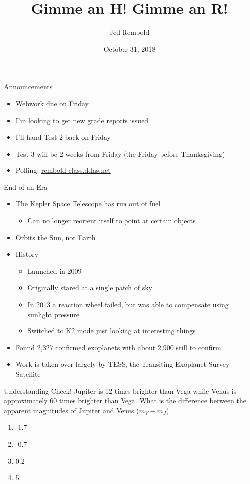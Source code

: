 \documentclass[pdf,aspectratio=169]{beamer}
\title{Gimme an H! Gimme an R!}
\date{October 31, 2018}
\author{Jed Rembold}
\begin{document}
\renewcommand*{\theenumi}{\Alph{enumi}}

\begin{frame}{Announcements}
	\begin{itemize}
		\item Webwork due on Friday
		\item I'm looking to get new grade reports issued
		\item I'll hand Test 2 back on Friday
		\item Test 3 will be 2 weeks from Friday (the Friday before Thanksgiving)
		\item Polling: \url{rembold-class.ddns.net}
	\end{itemize}
\end{frame}

\begin{frame}{End of an Era}
	\begin{itemize}
		\item The Kepler Space Telescope has run out of fuel
			\begin{itemize}
				\item Can no longer reorient itself to point at certain objects
			\end{itemize}
		\item Orbits the Sun, not Earth
		\item History
			\begin{itemize}
				\item Launched in 2009
				\item Originally stared at a single patch of sky
				\item In 2013 a reaction wheel failed, but was able to compensate using sunlight pressure
				\item Switched to K2 mode just looking at interesting things
			\end{itemize}
		\item Found 2,327 confirmed exoplanets with about 2,900 still to confirm
		\item Work is taken over largely by TESS, the Transiting Exoplanet Survey Satellite
	\end{itemize}
\end{frame}

\begin{frame}{Understanding Check!}
  Jupiter is 12 times brighter than Vega while Venus is approximately 60 times brighter than Vega. What is the difference between the apparent magnitudes of Jupiter and Venus ($m_V - m_J$)
  \begin{enumerate}
	\item \alert<2>{-1.7}
	\item -0.7
	\item 0.2
	\item 5
  \end{enumerate}
\end{frame}
\end{document}
